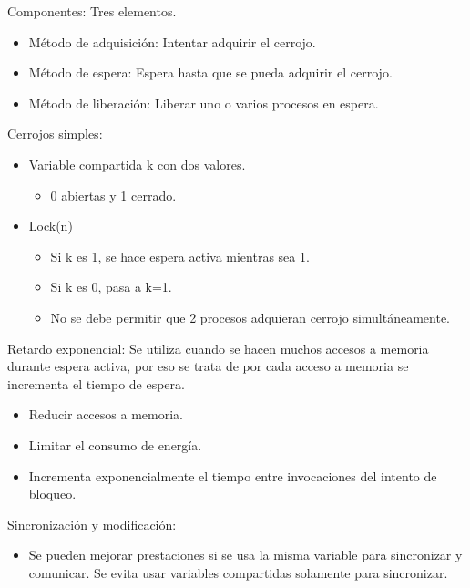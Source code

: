 \documentclass[12pt, twoside, openright]{report} %
\begin{document}
Componentes: Tres elementos.

\begin{itemize}

	\item Método de adquisición: Intentar adquirir el cerrojo.
	\item Método de espera: Espera hasta que se pueda adquirir el cerrojo.
	\item Método de liberación: Liberar uno o varios procesos en espera.
\end{itemize}
\pagebreak
Cerrojos simples:

\begin{itemize}

	\item Variable compartida k con dos valores.

	      \begin{itemize}

		      \item 0 abiertas y 1 cerrado.
	      \end{itemize}
	\item Lock(n)

	      \begin{itemize}

		      \item Si k es 1, se hace espera activa mientras sea 1.
		      \item Si k es 0, pasa a k=1.
		      \item No se debe permitir que 2 procesos adquieran cerrojo
		            simultáneamente.
	      \end{itemize}
\end{itemize}

Retardo exponencial: Se utiliza cuando se hacen muchos accesos a
memoria durante espera activa, por eso se trata de por cada acceso
a memoria se incrementa el tiempo de espera.

\begin{itemize}

	\item Reducir accesos a memoria.
	\item Limitar el consumo de energía.
	\item Incrementa exponencialmente el tiempo entre invocaciones del
	      intento de bloqueo.
\end{itemize}

Sincronización y modificación:

\begin{itemize}

	\item Se pueden mejorar prestaciones si se usa la misma variable para
	      sincronizar y comunicar. Se evita usar variables compartidas
	      solamente para sincronizar.
\end{itemize}
\end{document}
